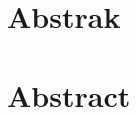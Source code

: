 \documentclass[oneside,12pt]{book}
\newcommand\listofappendices{\listofatoc}
\begin{document}
\chapter{Abstrak}

\chapter{Abstract}

\tableofcontents

\listoffigures

\listoftables

\lstlistoflistings

\listofappendices





\mainmatter
\end{document}
